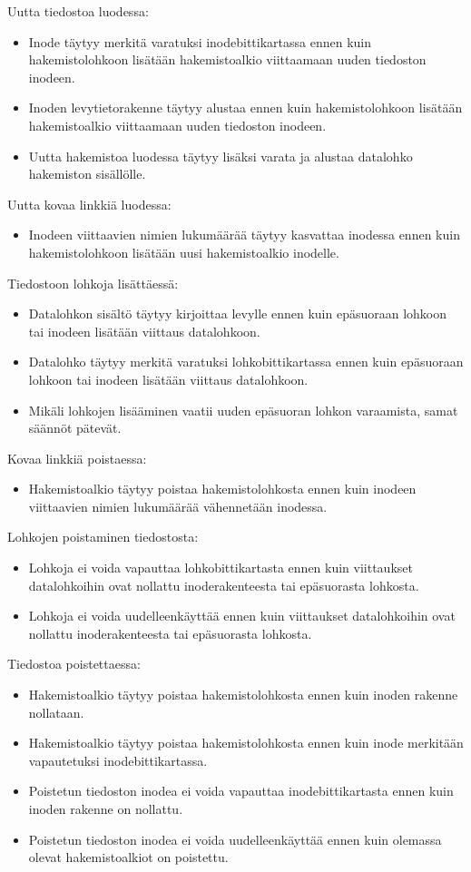 Uutta tiedostoa luodessa:
\begin{itemize}
    \item{Inode täytyy merkitä varatuksi inodebittikartassa ennen kuin hakemistolohkoon lisätään hakemistoalkio viittaamaan uuden tiedoston inodeen.}
    \item{Inoden levytietorakenne täytyy alustaa ennen kuin hakemistolohkoon lisätään hakemistoalkio viittaamaan uuden tiedoston inodeen.}
    \item{Uutta hakemistoa luodessa täytyy lisäksi varata ja alustaa datalohko hakemiston sisällölle.}
\end{itemize}
Uutta kovaa linkkiä luodessa:
\begin{itemize}
    \item{Inodeen viittaavien nimien lukumäärää täytyy kasvattaa inodessa ennen kuin hakemistolohkoon lisätään uusi hakemistoalkio inodelle.}
\end{itemize}
Tiedostoon lohkoja lisättäessä:
\begin{itemize}
    \item{Datalohkon sisältö täytyy kirjoittaa levylle ennen kuin epäsuoraan lohkoon tai inodeen lisätään viittaus datalohkoon.}
    \item{Datalohko täytyy merkitä varatuksi lohkobittikartassa ennen kuin epäsuoraan lohkoon tai inodeen lisätään viittaus datalohkoon.}
    \item{Mikäli lohkojen lisääminen vaatii uuden epäsuoran lohkon varaamista, samat säännöt pätevät.}
\end{itemize}
Kovaa linkkiä poistaessa:
\begin{itemize}
    \item{Hakemistoalkio täytyy poistaa hakemistolohkosta ennen kuin inodeen viittaavien nimien lukumäärää vähennetään inodessa.}
\end{itemize}
Lohkojen poistaminen tiedostosta:
\begin{itemize}
    \item{Lohkoja ei voida vapauttaa lohkobittikartasta ennen kuin viittaukset datalohkoihin ovat nollattu inoderakenteesta tai epäsuorasta lohkosta.}
    \item{Lohkoja ei voida uudelleenkäyttää ennen kuin viittaukset datalohkoihin ovat nollattu inoderakenteesta tai epäsuorasta lohkosta.}
\end{itemize}
Tiedostoa poistettaessa:
\begin{itemize}
    \item{Hakemistoalkio täytyy poistaa hakemistolohkosta ennen kuin inoden rakenne nollataan.}
    \item{Hakemistoalkio täytyy poistaa hakemistolohkosta ennen kuin inode merkitään vapautetuksi inodebittikartassa.}
    \item{Poistetun tiedoston inodea ei voida vapauttaa inodebittikartasta ennen kuin inoden rakenne on nollattu.}
    \item{Poistetun tiedoston inodea ei voida uudelleenkäyttää ennen kuin olemassa olevat hakemistoalkiot on poistettu.}
\end{itemize}

